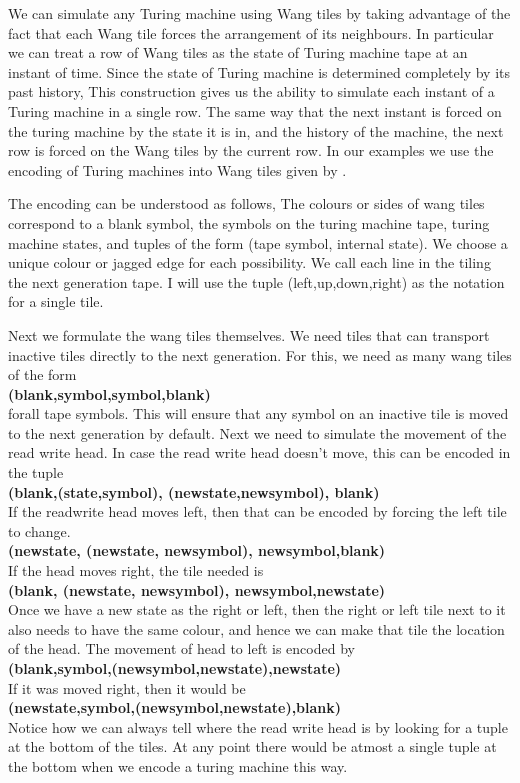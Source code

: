 \documentclass{article}
\begin{document}
We can simulate any Turing machine using Wang tiles by taking advantage of the fact that each Wang tile forces the arrangement of its neighbours. In particular we can treat a row of Wang tiles as the state of Turing machine tape at an instant of time. Since the state of Turing machine is determined completely by its past history, This construction gives us the ability to simulate each instant of a Turing machine in a single row. The same way that the next instant is forced on the turing machine by the state it is in, and the history of the machine, the next row is forced on the Wang tiles by the current row. In our examples we use the encoding of Turing machines into Wang tiles given by \cite{chaitin}.

The encoding can be understood as follows, The colours or sides of wang tiles correspond to a blank symbol, the symbols on the turing machine tape, turing machine states, and tuples of the form (tape symbol, internal state). We choose a unique colour or jagged edge for each possibility. We call each line in the tiling the next generation tape. I will use the tuple (left,up,down,right) as the notation for a single tile.

Next we formulate the wang tiles themselves. We need tiles that can transport inactive tiles directly to the next generation. For this, we need as many wang tiles of the form \\
{\bf(blank,symbol,symbol,blank)}\\
forall tape symbols. This will ensure that any symbol on an inactive tile is moved to the next generation by default.
Next we need to simulate the movement of the read write head. In case the read write head doesn't move, this can be encoded in the tuple \\
{\bf(blank,(state,symbol), (newstate,newsymbol), blank)}\\
If the readwrite head moves left, then that can be encoded by forcing the left tile to change.\\
{\bf(newstate, (newstate, newsymbol), newsymbol,blank)}\\
If the head moves right, the tile needed is \\
{\bf(blank, (newstate, newsymbol), newsymbol,newstate)}\\
Once we have a new state as the right or left, then the right or left tile next to it also needs to have the same colour, and hence we can make that tile the location of the head. The movement of head to left is encoded by \\
{\bf(blank,symbol,(newsymbol,newstate),newstate)}\\
If it was moved right, then it would be\\
{\bf(newstate,symbol,(newsymbol,newstate),blank)}\\
Notice how we can always tell where the read write head is by looking for a tuple at the bottom of the tiles. At any point there would be atmost a single tuple at the bottom when we encode a turing machine this way.
\end{document}
